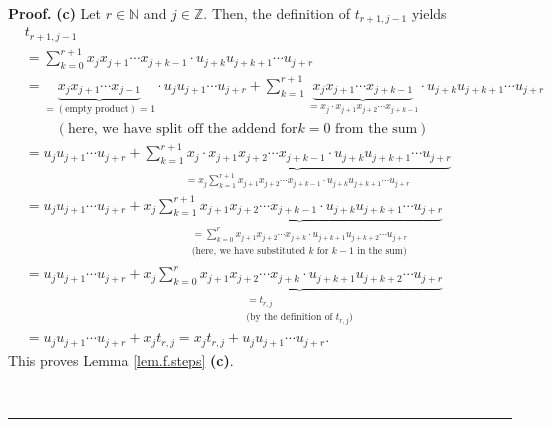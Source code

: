 \documentclass[numbers=enddot,12pt,final,onecolumn,notitlepage]{scrartcl}%
\theoremstyle{definition}
\newenvironment{proof}[1][Proof]{\noindent\textbf{#1.} }{\ \rule{0.5em}{0.5em}}
\let\sumnonlimits\sum
\renewcommand{\sum}{\sumnonlimits\limits}
\newenvironment{vershort}{}{}
\begin{document}
\begin{proof}
\begin{vershort}
\textbf{(c)} Let $r\in\mathbb{N}$ and $j\in\mathbb{Z}$. Then, the definition
of $t_{r+1,j-1}$ yields%
\begin{align*}
&  t_{r+1,j-1}\\
&  =\sum_{k=0}^{r+1}x_{j}x_{j+1}\cdots x_{j+k-1}\cdot u_{j+k}u_{j+k+1}\cdots
u_{j+r}\\
&  =\underbrace{x_{j}x_{j+1}\cdots x_{j-1}}_{=\left(  \text{empty
product}\right)  =1}\cdot u_{j}u_{j+1}\cdots u_{j+r}+\sum_{k=1}^{r+1}%
\underbrace{x_{j}x_{j+1}\cdots x_{j+k-1}}_{=x_{j}\cdot x_{j+1}x_{j+2}\cdots
x_{j+k-1}}\cdot u_{j+k}u_{j+k+1}\cdots u_{j+r}\\
&  \ \ \ \ \ \ \ \ \ \ \left(  \text{here, we have split off the addend for
}k=0\text{ from the sum}\right) \\
&  =u_{j}u_{j+1}\cdots u_{j+r}+\underbrace{\sum_{k=1}^{r+1}x_{j}\cdot
x_{j+1}x_{j+2}\cdots x_{j+k-1}\cdot u_{j+k}u_{j+k+1}\cdots u_{j+r}}%
_{=x_{j}\sum_{k=1}^{r+1}x_{j+1}x_{j+2}\cdots x_{j+k-1}\cdot u_{j+k}%
u_{j+k+1}\cdots u_{j+r}}\\
&  =u_{j}u_{j+1}\cdots u_{j+r}+x_{j}\underbrace{\sum_{k=1}^{r+1}x_{j+1}%
x_{j+2}\cdots x_{j+k-1}\cdot u_{j+k}u_{j+k+1}\cdots u_{j+r}}_{\substack{=\sum
_{k=0}^{r}x_{j+1}x_{j+2}\cdots x_{j+k}\cdot u_{j+k+1}u_{j+k+2}\cdots
u_{j+r}\\\text{(here, we have substituted }k\text{ for }k-1\text{ in the
sum)}}}\\
&  =u_{j}u_{j+1}\cdots u_{j+r}+x_{j}\underbrace{\sum_{k=0}^{r}x_{j+1}%
x_{j+2}\cdots x_{j+k}\cdot u_{j+k+1}u_{j+k+2}\cdots u_{j+r}}%
_{\substack{=t_{r,j}\\\text{(by the definition of }t_{r,j}\text{)}}}\\
&  =u_{j}u_{j+1}\cdots u_{j+r}+x_{j}t_{r,j}=x_{j}t_{r,j}+u_{j}u_{j+1}\cdots
u_{j+r}.
\end{align*}
This proves Lemma \ref{lem.f.steps} \textbf{(c)}.
\end{vershort}


\end{proof}
\end{document}

